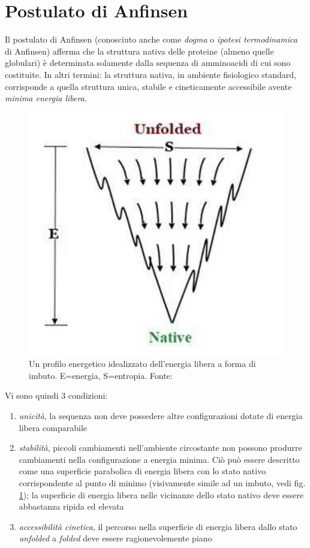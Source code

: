 \section{Postulato di Anfinsen}
{
Il postulato di Anfinsen (conosciuto anche come \textit{dogma} o \textit{ipotesi termodinamica} di Anfinsen) afferma che la struttura nativa delle proteine (almeno quelle globulari) è determinata solamente dalla sequenza di amminoacidi di cui sono costituite. In altri termini: la struttura nativa, in ambiente fisiologico standard, corrisponde a quella struttura unica, stabile e cineticamente accessibile avente \textit{minima energia libera}. 

\begin{figure}[h]
	\centering
	\includegraphics[scale=0.3]{images/funnel-folding.png}
	\caption{Un profilo energetico idealizzato dell'energia libera a forma di imbuto. E=energia, S=entropia. Fonte: \cite{pal2019fundamentals}}
	\label{fig:funnel}
\end{figure}

Vi sono quindi 3 condizioni:

\begin{enumerate}
	\item \textit{unicità}, la sequenza non deve possedere altre configurazioni dotate di energia libera comparabile
	\item \textit{stabilità}, piccoli cambiamenti nell'ambiente circostante non possono produrre cambiamenti nella configurazione a energia minima. Ciò può essere descritto come una superficie parabolica di energia libera con lo stato nativo corrispondente al punto di minimo (visivamente simile ad un imbuto, vedi fig. \ref{fig:funnel}); la superficie di energia libera nelle vicinanze dello stato nativo deve essere abbastanza ripida ed elevata
	\item \textit{accessibilità cinetica}, il percorso nella superficie di energia libera dallo stato \textit{unfolded} a \textit{folded} deve essere ragionevolemente piano
\end{enumerate}


}
